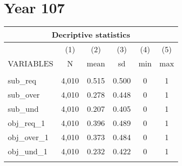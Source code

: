 \documentclass[]{article}
\begin{document}
\section*{Year 107}

\begin{tabular}{lccccc}
\multicolumn{6}{c}{Decriptive statistics} \\ \hline
 & (1) & (2) & (3) & (4) & (5) \\
VARIABLES & N & mean & sd & min & max \\ \hline
 &  &  &  &  &  \\
sub\_req & 4,010 & 0.515 & 0.500 & 0 & 1 \\
sub\_over & 4,010 & 0.278 & 0.448 & 0 & 1 \\
sub\_und & 4,010 & 0.207 & 0.405 & 0 & 1 \\
obj\_req\_1 & 4,010 & 0.396 & 0.489 & 0 & 1 \\
obj\_over\_1 & 4,010 & 0.373 & 0.484 & 0 & 1 \\
obj\_und\_1 & 4,010 & 0.232 & 0.422 & 0 & 1 \\
 &  &  &  &  &  \\ \hline
\end{tabular}
\end{document}
